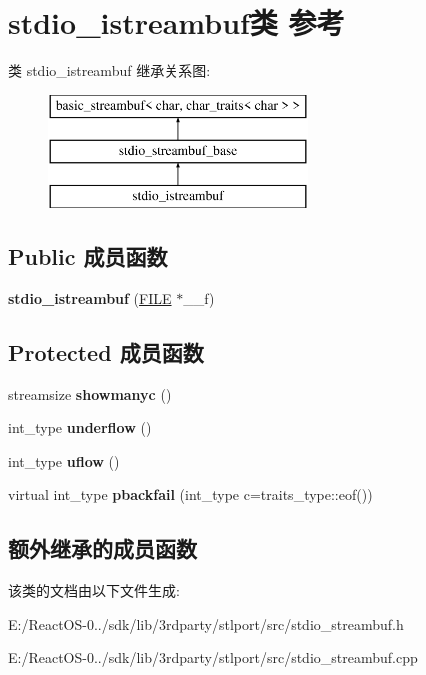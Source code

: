 \hypertarget{classstdio__istreambuf}{}\section{stdio\+\_\+istreambuf类 参考}
\label{classstdio__istreambuf}
类 stdio\+\_\+istreambuf 继承关系图\+:\begin{figure}[H]
\begin{center}
\leavevmode
\includegraphics[height=3.000000cm]{classstdio__istreambuf}
\end{center}
\end{figure}
\subsection*{Public 成员函数}
\begin{DoxyCompactItemize}
\item 
\mbox{\label{classstdio__istreambuf_a2787078b61a89cd4bcd9f4cd8529386c}} 
{\bfseries stdio\+\_\+istreambuf} (\hyperlink{struct__iobuf}{F\+I\+LE} $\ast$\+\_\+\+\_\+f)
\end{DoxyCompactItemize}
\subsection*{Protected 成员函数}
\begin{DoxyCompactItemize}
\item 
\mbox{\label{classstdio__istreambuf_ab5a28f5d162ec599f67d57db0dde2a42}} 
streamsize {\bfseries showmanyc} ()
\item 
\mbox{\label{classstdio__istreambuf_af2b6e06e1d2a31a893cb2e556f03d22a}} 
int\+\_\+type {\bfseries underflow} ()
\item 
\mbox{\label{classstdio__istreambuf_ab14936455540225af903f52469ff81f2}} 
int\+\_\+type {\bfseries uflow} ()
\item 
\mbox{\label{classstdio__istreambuf_a70fe7893be613d6b1161fcb273e28919}} 
virtual int\+\_\+type {\bfseries pbackfail} (int\+\_\+type c=traits\+\_\+type\+::eof())
\end{DoxyCompactItemize}
\subsection*{额外继承的成员函数}


该类的文档由以下文件生成\+:\begin{DoxyCompactItemize}
\item 
E\+:/\+React\+O\+S-\/0../sdk/lib/3rdparty/stlport/src/stdio\+\_\+streambuf.\+h\item 
E\+:/\+React\+O\+S-\/0../sdk/lib/3rdparty/stlport/src/stdio\+\_\+streambuf.\+cpp\end{DoxyCompactItemize}
